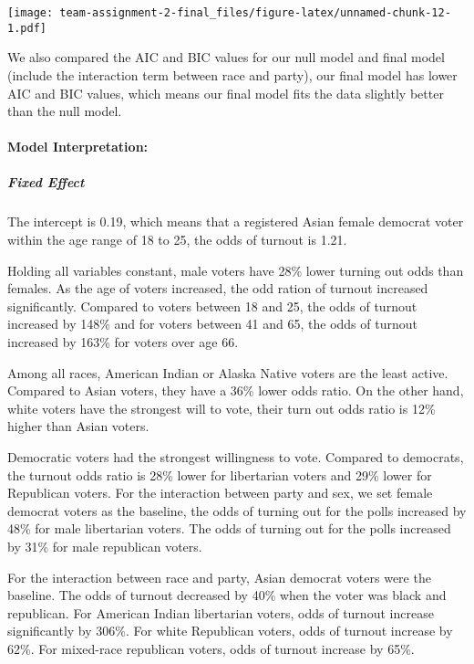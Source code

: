 \documentclass[
]{article}
\begin{document}
\texttt{[image: team-assignment-2-final\_files/figure-latex/unnamed-chunk-12-1.pdf]}

We also compared the AIC and BIC values for our null model and final
model (include the interaction term between race and party), our final
model has lower AIC and BIC values, which means our final model fits the
data slightly better than the null model.

\hypertarget{model-interpretation}{%
\paragraph{Model Interpretation:}\label{model-interpretation}}

\hypertarget{fixed-effect}{%
\subparagraph{Fixed Effect}\label{fixed-effect}}

The intercept is 0.19, which means that a registered Asian female
democrat voter within the age range of 18 to 25, the odds of turnout is
1.21.

Holding all variables constant, male voters have 28\% lower turning out
odds than females. As the age of voters increased, the odd ration of
turnout increased significantly. Compared to voters between 18 and 25,
the odds of turnout increased by 148\% and for voters between 41 and 65,
the odds of turnout increased by 163\% for voters over age 66.

Among all races, American Indian or Alaska Native voters are the least
active. Compared to Asian voters, they have a 36\% lower odds ratio. On
the other hand, white voters have the strongest will to vote, their turn
out odds ratio is 12\% higher than Asian voters.

Democratic voters had the strongest willingness to vote. Compared to
democrats, the turnout odds ratio is 28\% lower for libertarian voters
and 29\% lower for Republican voters. For the interaction between party
and sex, we set female democrat voters as the baseline, the odds of
turning out for the polls increased by 48\% for male libertarian voters.
The odds of turning out for the polls increased by 31\% for male
republican voters.

For the interaction between race and party, Asian democrat voters were
the baseline. The odds of turnout decreased by 40\% when the voter was
black and republican. For American Indian libertarian voters, odds of
turnout increase significantly by 306\%. For white Republican voters,
odds of turnout increase by 62\%. For mixed-race republican voters, odds
of turnout increase by 65\%.
\end{document}
